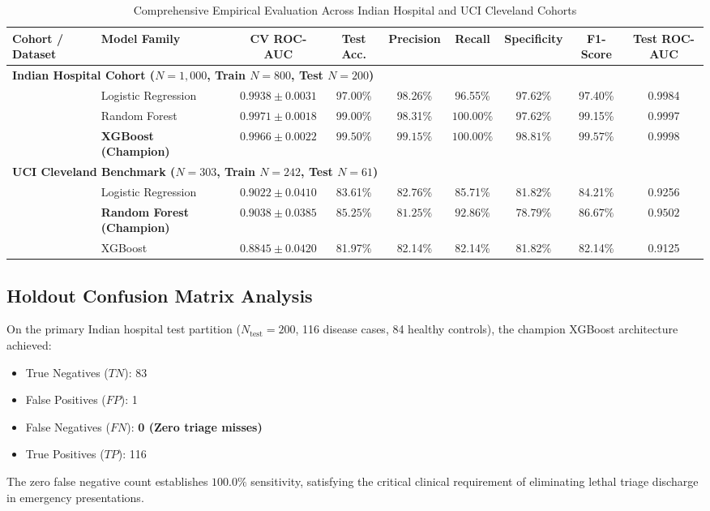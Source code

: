 \documentclass[conference]{IEEEtran}
\begin{document}
\begin{table}[t]
\caption{Comprehensive Empirical Evaluation Across Indian Hospital and UCI Cleveland Cohorts}
\label{tab:master_results}
\centering
\small
\begin{tabularx}{\textwidth}{l l c c c c c c c}
\toprule
\textbf{Cohort / Dataset} & \textbf{Model Family} & \textbf{CV ROC-AUC} & \textbf{Test Acc.} & \textbf{Precision} & \textbf{Recall} & \textbf{Specificity} & \textbf{F1-Score} & \textbf{Test ROC-AUC} \\
\midrule
\multicolumn{9}{l}{\textbf{Indian Hospital Cohort ($N=1,000$, Train $N=800$, Test $N=200$)}} \\
& Logistic Regression & $0.9938 \pm 0.0031$ & 97.00\% & 98.26\% & 96.55\% & 97.62\% & 97.40\% & 0.9984 \\
& Random Forest & $\mathbf{0.9971 \pm 0.0018}$ & 99.00\% & 98.31\% & $\mathbf{100.00\%}$ & 97.62\% & 99.15\% & 0.9997 \\
& \textbf{XGBoost (Champion)} & $0.9966 \pm 0.0022$ & $\mathbf{99.50\%}$ & $\mathbf{99.15\%}$ & $\mathbf{100.00\%}$ & $\mathbf{98.81\%}$ & $\mathbf{99.57\%}$ & $\mathbf{0.9998}$ \\
\midrule
\multicolumn{9}{l}{\textbf{UCI Cleveland Benchmark ($N=303$, Train $N=242$, Test $N=61$)}} \\
& Logistic Regression & $0.9022 \pm 0.0410$ & 83.61\% & 82.76\% & 85.71\% & 81.82\% & 84.21\% & 0.9256 \\
& \textbf{Random Forest (Champion)} & $\mathbf{0.9038 \pm 0.0385}$ & $\mathbf{85.25\%}$ & $\mathbf{81.25\%}$ & $\mathbf{92.86\%}$ & $\mathbf{78.79\%}$ & $\mathbf{86.67\%}$ & $\mathbf{0.9502}$ \\
& XGBoost & $0.8845 \pm 0.0420$ & 81.97\% & 82.14\% & 82.14\% & 81.82\% & 82.14\% & 0.9125 \\
\bottomrule
\end{tabularx}
\end{table}

\subsection{Holdout Confusion Matrix Analysis}
On the primary Indian hospital test partition ($N_{\text{test}}=200$, 116 disease cases, 84 healthy controls), the champion XGBoost architecture achieved:
\begin{itemize}
    \item True Negatives ($TN$): 83
    \item False Positives ($FP$): 1
    \item False Negatives ($FN$): \textbf{0 (Zero triage misses)}
    \item True Positives ($TP$): 116
\end{itemize}
The zero false negative count establishes $100.0\%$ sensitivity, satisfying the critical clinical requirement of eliminating lethal triage discharge in emergency presentations.
\end{document}
